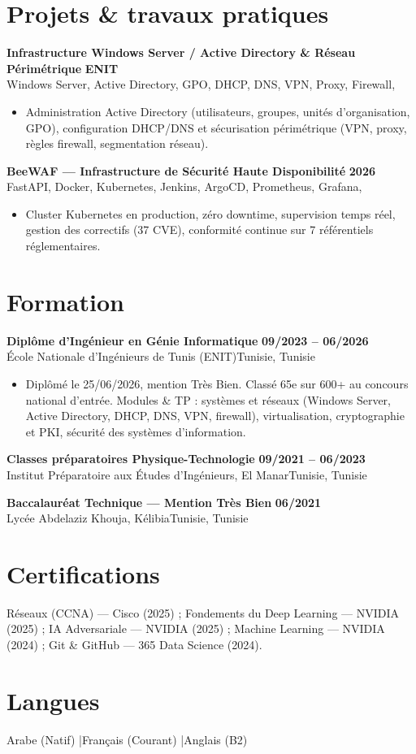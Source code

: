 \documentclass[a4paper,9pt]{article}
\newcommand{\cventry}[4]{\textbf{#1} \hfill \textbf{#4}\\[0.2pt]#2{\ifx\relax#3\relax\else, #3\fi}\par\vspace{0.3pt}}
\begin{document}
\section{Projets \& travaux pratiques}
\cventry{Infrastructure Windows Server / Active Directory \& Réseau Périmétrique}{Windows Server, Active Directory, GPO, DHCP, DNS, VPN, Proxy, Firewall}{}{ENIT}
\begin{itemize}
  \item Administration Active Directory (utilisateurs, groupes, unités d'organisation, GPO), configuration DHCP/DNS et sécurisation périmétrique (VPN, proxy, règles firewall, segmentation réseau).
\end{itemize}
\cventry{BeeWAF --- Infrastructure de Sécurité Haute Disponibilité}{FastAPI, Docker, Kubernetes, Jenkins, ArgoCD, Prometheus, Grafana}{}{2026}
\begin{itemize}
  \item Cluster Kubernetes en production, zéro downtime, supervision temps réel, gestion des correctifs (37 CVE), conformité continue sur 7 référentiels réglementaires.
\end{itemize}
\section{Formation}
\cventry{Diplôme d'Ingénieur en Génie Informatique}{École Nationale d'Ingénieurs de Tunis (ENIT)}{Tunisie}{09/2023 -- 06/2026}
\begin{itemize}
  \item Diplômé le 25/06/2026, mention Très Bien. Classé 65e sur 600+ au concours national d'entrée. Modules \& TP : systèmes et réseaux (Windows Server, Active Directory, DHCP, DNS, VPN, firewall), virtualisation, cryptographie et PKI, sécurité des systèmes d'information.
\end{itemize}
\cventry{Classes préparatoires Physique-Technologie}{Institut Préparatoire aux Études d'Ingénieurs, El Manar}{Tunisie}{09/2021 -- 06/2023}
\cventry{Baccalauréat Technique --- Mention Très Bien}{Lycée Abdelaziz Khouja, Kélibia}{Tunisie}{06/2021}
\section{Certifications}
Réseaux (CCNA) --- Cisco (2025) ; Fondements du Deep Learning --- NVIDIA (2025) ; IA Adversariale --- NVIDIA (2025) ; Machine Learning --- NVIDIA (2024) ; Git \& GitHub --- 365 Data Science (2024).
\section{Langues}
Arabe (Natif) \quad|\quad Français (Courant) \quad|\quad Anglais (B2)
\end{document}
